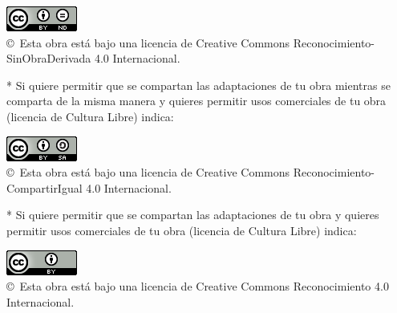 \begin{center}
\includegraphics[scale=1.5]{Imagenes/Licencias/by-nd_88x31}\\[10mm]
{\Large \copyright~Esta obra está bajo una licencia de Creative Commons Reconocimiento-SinObraDerivada 4.0 Internacional.
}
\end{center}


\bigskip
* Si quiere permitir que se compartan las adaptaciones de tu obra mientras se comparta de la misma manera
y quieres permitir usos comerciales de tu obra (licencia de Cultura Libre) indica:

\begin{center}
\includegraphics[scale=1.5]{Imagenes/Licencias/by-sa_88x31}\\[10mm]
{\Large \copyright~Esta obra está bajo una licencia de Creative Commons Reconocimiento-CompartirIgual 4.0 Internacional.
}
\end{center}


\bigskip
* Si quiere permitir que se compartan las adaptaciones de tu obra
y quieres permitir usos comerciales de tu obra (licencia de Cultura Libre) indica:

\begin{center}
\includegraphics[scale=1.5]{Imagenes/Licencias/by_88x31}\\[10mm]
{\Large \copyright~Esta obra está bajo una licencia de Creative Commons Reconocimiento 4.0 Internacional.
}
\end{center}
